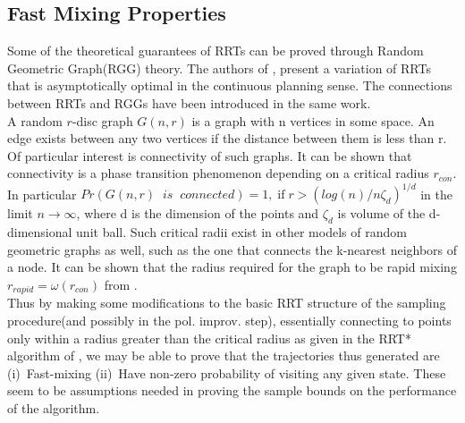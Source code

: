 \documentclass[wcp]{jmlr}
\begin{document}
\subsection*{Fast Mixing Properties}
Some of the theoretical guarantees of RRTs can be proved through Random Geometric Graph(RGG) theory. The authors of \citep{karaman}, present a variation of RRTs that is asymptotically optimal in the continuous planning sense. The connections between RRTs and RGGs have been introduced in the same work.\\
A random $r$-disc graph $G(n,r)$ is a graph with n vertices in some space. An edge exists between any two vertices if the distance between them is less than r. Of particular interest is connectivity of such graphs. It can be shown that connectivity is a phase transition phenomenon depending on a critical radius $r_{con}$. In particular $Pr(G(n,r)\;\;is\;\;connected)=1,\;\text{if}\;r>(log(n)/n\zeta_d)^{1/d}$ in the limit $n\rightarrow \infty $, where d is the dimension of the points and $\zeta_d$ is volume of the d-dimensional unit ball.
Such critical radii exist in other models of random geometric graphs as well, such as the one that connects the k-nearest neighbors of a node. It can be shown that the radius required for the graph to be rapid mixing $r_{rapid} = \omega(r_{con})$ from \citep{chenavin}.\\
Thus by making some modifications to the basic RRT structure of the sampling procedure(and possibly in the pol. improv. step), essentially connecting to points only within a radius greater than the critical radius as given in the RRT* algorithm of \citep{karaman}, we may be able to prove that the trajectories thus generated are (i)~Fast-mixing (ii)~Have non-zero probability of visiting any given state. These seem to be assumptions needed in proving the sample bounds on the performance of the algorithm.
\end{document}

